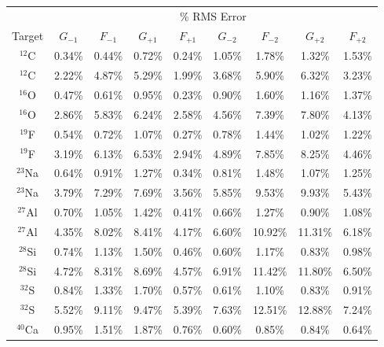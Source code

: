 \documentclass[12pt,letterpaper]{book}
\begin{document}
\begin{table}
\centering
{
\renewcommand{\arraystretch}{1.2}
\begin{tabular}{ccccccccc}
\hline
\hline
& \multicolumn{8}{c}{\% RMS Error}\\
Target & $G_{-1}$ & $F_{-1}$ & $G_{+1}$ & $F_{+1}$ & $G_{-2}$ & $F_{-2}$ & $G_{+2}$ & $F_{+2}$ \\
\hline
$^{12}$C & 0.34\% & 0.44\% & 0.72\% & 0.24\% & 1.05\% & 1.78\% & 	1.32\% & 1.53\% \\
\vspace*{2mm}
$^{12}$C & 2.22\% & 4.87\% & 5.29\% & 1.99\% & 3.68\% & 5.90\% & 6.32\% & 3.23\% \\
$^{16}$O & 0.47\% & 0.61\% & 0.95\% & 0.23\% & 0.90\% & 1.60\% & 1.16\% & 1.37\% \\
\vspace*{2mm}
$^{16}$O & 2.86\% & 5.83\% & 6.24\% & 2.58\% & 4.56\% & 7.39\% & 7.80\% & 4.13\% \\
$^{19}$F & 0.54\% & 0.72\% & 1.07\% & 0.27\% & 0.78\% & 1.44\% & 1.02\% & 1.22\% \\
\vspace*{2mm}
$^{19}$F & 3.19\% & 6.13\% & 6.53\% & 2.94\% & 4.89\% & 7.85\% & 8.25\% & 4.46\% \\
$^{23}$Na & 0.64\% & 0.91\% & 1.27\% & 0.34\% & 0.81\% & 1.48\% & 1.07\% & 1.25\% \\
\vspace*{2mm}
$^{23}$Na & 3.79\% & 7.29\% & 7.69\% & 3.56\% & 5.85\% & 9.53\% & 9.93\% & 5.43\% \\
$^{27}$Al & 0.70\% & 1.05\% & 1.42\% & 0.41\% & 0.66\% & 1.27\% & 0.90\% & 1.08\% \\
\vspace*{2mm}
$^{27}$Al & 4.35\% & 8.02\% & 8.41\% & 4.17\% & 6.60\% & 10.92\% & 11.31\% & 6.18\% \\
$^{28}$Si & 0.74\% & 1.13\% & 1.50\% & 0.46\% & 0.60\% & 1.17\% & 0.83\% & 0.98\% \\
\vspace*{2mm}
$^{28}$Si & 4.72\% & 8.31\% & 8.69\% & 4.57\% & 6.91\% & 11.42\% & 11.80\% & 6.50\% \\
$^{32}$S & 0.84\% & 1.33\% & 1.70\% & 0.57\% & 0.61\% & 1.10\% & 0.83\% & 0.91\% \\
\vspace*{2mm}
$^{32}$S & 5.52\% & 9.11\% & 9.47\% & 5.39\% & 7.63\% & 12.51\% & 12.88\% & 7.24\% \\
$^{40}$Ca & 0.95\% & 1.51\% & 1.87\% & 0.76\% & 0.60\% & 0.85\% & 0.84\% & 0.64\% \\

\end{tabular}}
\end{table}
\end{document}
